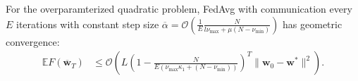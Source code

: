 \begin{comment}
In general $H$ has zero eigevalues. However, because the null space
of $H$ and range of $H$ are orthogonal, in our subsequence analysis
it suffices to project $\overline{\mathbf{w}}_{t}-\mathbf{w}^{\ast}$
onto the range of $H$, thus we may restrict to the non-zero eigenvalue
of $H$. We can use $\mathbf{w}^{\ast T}\mathbf{x}_{k}^{j}-z_{k}^{j}\equiv0$
to rewrite the local objectives as $F_{k}(\mathbf{w})=\frac{1}{2}\langle\mathbf{w}-\mathbf{w}^{\ast},H^{k}(\mathbf{w}-\mathbf{w}^{\ast})\rangle\equiv\frac{1}{2}\|\mathbf{w}-\mathbf{w}^{\ast}\|_{H^{k}}^{2}$
so that $F(\mathbf{w})=\frac{1}{2}\|\mathbf{w}-\mathbf{w}^{\ast}\|_{H}^{2}$.
\end{comment}
\begin{comment}
\begin{align*}
F_{k}(w) & =\frac{1}{2n_{k}}\sum_{j=1}^{n_{k}}(w^{T}x_{k,j}-z_{k,j}-(w^{\ast T}x_{k,j}-z_{k,j}))^{2}=\frac{1}{2n_{k}}\sum_{j=1}^{n_{k}}((w-w^{\ast})^{T}x_{k,j})^{2}\\
& =\frac{1}{2}\langle w-w^{\ast},H^{k}(w-w^{\ast})\rangle=\frac{1}{2}\|w-w^{\ast}\|_{H^{k}}^{2}
\end{align*}
\end{comment}
\begin{comment}
Let $\xi_{t}^{k}$ be the stochastic sample on the $k$th device at
time $t$, and define $\tilde{H}_{t}^{k}:=\xi_{t}^{k}(\xi_{t}^{k})^{T}$
as the stochastic Hessian matrix. %
\end{comment}
\begin{comment}
Note that $\mathbb{E}\tilde{H}_{t}^{k}=\frac{1}{n_{k}}\sum_{j=1}^{n_{k}}\mathbf{x}_{k}^{j}(\mathbf{x}_{k}^{j})^{T}=H^{k}$
and $\mathbf{g}_{t,k}=\nabla F_{k}(\mathbf{w}_{t}^{k},\xi_{t}^{k})=\tilde{H}_{t}^{k}(\mathbf{w}_{t}^{k}-\mathbf{w}^{\ast})$
while $\mathbf{g}_{t}=\sum_{k=1}^{N}p_{k}\nabla F_{k}(\mathbf{w}_{t}^{k},\xi_{t}^{k})=\sum_{k=1}^{N}p_{k}\tilde{H}_{t}^{k}(\mathbf{w}_{t}^{k}-\mathbf{w}^{\ast})$.
\end{comment}

\begin{theorem}
	\label{thm:overparameterized_quadratic}For the overparamterized quadratic
	problem, FedAvg with communication every $E$
	iterations with constant step size $\overline{\alpha}=\mathcal{O}(\frac{1}{E}\frac{N}{l\nu_{\max}+\mu(N-\nu_{\min})})$
	has geometric convergence:
	\begin{align*}
	\mathbb{E}F(\overline{\mathbf{w}}_{T}) & \leq\mathcal{O}\left(L(1-\frac{N}{E(\nu_{\max}\kappa_{1}+(N-\nu_{\min}))})^{T}\|\mathbf{w}_{0}-\mathbf{w}^{\ast}\|^{2}\right).
	\end{align*}
\end{theorem}

